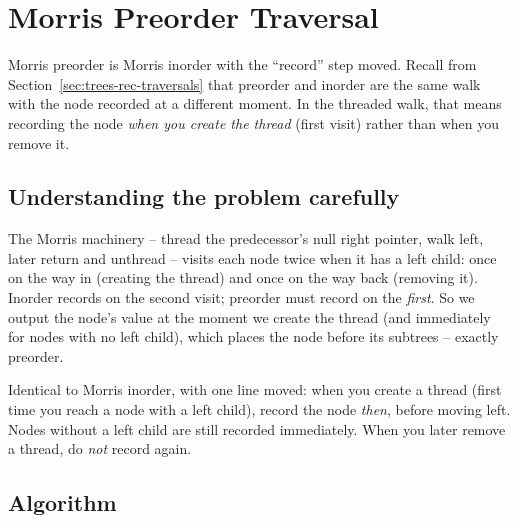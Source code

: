 \section{Morris Preorder Traversal}
\label{sec:trees-morris-preorder}


\begin{patternbox}
Morris preorder is Morris inorder with the ``record'' step moved. Recall
from Section~\ref{sec:trees-rec-traversals} that preorder and inorder are
the same walk with the node recorded at a different moment. In the threaded
walk, that means recording the node \emph{when you create the thread}
(first visit) rather than when you remove it.
\end{patternbox}

\subsection*{Understanding the problem carefully}

The Morris machinery -- thread the predecessor's null right pointer, walk
left, later return and unthread -- visits each node twice when it has a left
child: once on the way in (creating the thread) and once on the way back
(removing it). Inorder records on the second visit; preorder must record on
the \emph{first}. So we output the node's value at the moment we create the
thread (and immediately for nodes with no left child), which places the
node before its subtrees -- exactly preorder.

\begin{ideabox}
Identical to Morris inorder, with one line moved: when you create a thread
(first time you reach a node with a left child), record the node
\emph{then}, before moving left. Nodes without a left child are still
recorded immediately. When you later remove a thread, do \emph{not} record
again.
\end{ideabox}

\subsection*{Algorithm}

